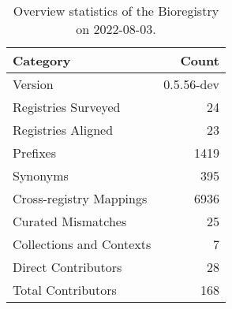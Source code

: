 \begin{table}
\centering
\caption{Overview statistics of the Bioregistry on 2022-08-03.}
\label{tab:bioregistry-summary}
\begin{tabular}{lr}
\toprule
                Category &      Count \\
\midrule
                 Version & 0.5.56-dev \\
     Registries Surveyed &         24 \\
      Registries Aligned &         23 \\
                Prefixes &       1419 \\
                Synonyms &        395 \\
 Cross-registry Mappings &       6936 \\
      Curated Mismatches &         25 \\
Collections and Contexts &          7 \\
     Direct Contributors &         28 \\
      Total Contributors &        168 \\
\bottomrule
\end{tabular}
\end{table}
